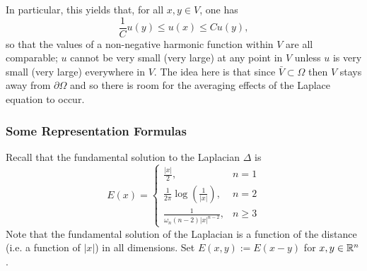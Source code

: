 \documentclass[11pt]{article}
\begin{document}
			\begin{remark}
				In particular, this yields that, for all $x,y\in V$, one has
				\begin{equation*}
					\frac{1}{C}u(y)\le u(x)\le Cu(y),
				\end{equation*}
				so that the values of a non-negative harmonic function within $V$ are all comparable; $u$ cannot be very small (very large) at any point in $V$ unless $u$ is very small (very large) everywhere in $V$. The idea here is that since $\bar{V}\subset\Omega$ then $V$ stays away from $\partial\Omega$ and so there is room for the averaging effects of the Laplace equation to occur.
			\end{remark}


			\subsubsection*{Some Representation Formulas}

				Recall that the fundamental solution to the Laplacian $\Delta$ is
				\begin{equation*}
					E(x)=
					\begin{cases}
						 \frac{|x|}{2}, & n=1\\
			\frac{1}{2\pi}\log\left(\frac{1}{|x|}\right), & n=2\\
			\frac{1}{\omega_n(n-2)|x|^{n-2}}, & n\ge3 \end{cases}
				\end{equation*}
				Note that the fundamental solution of the Laplacian is a function of the distance (i.e. a function of $|x|$) in all dimensions.
				Set $E(x,y):=E(x-y)$ for $x,y\in\mathbb{R}^n$.
\end{document}

